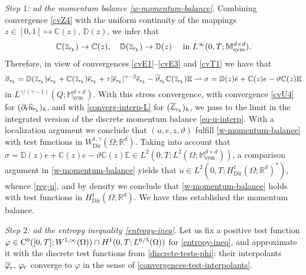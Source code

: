 \documentclass[a4paper,10pt,reqno]{amsart}
\numberwithin{equation}{section}
\newcommand{\bbM}{\mathbb{M}}
\newcommand{\R}{\mathbb{R}}
\numberwithin{equation}{section}
\newcommand{\weakto}{\rightharpoonup} %
\newcommand{\teta}{\vartheta}
\newcommand{\piecewiseConstant}[2]{\overline{#1}_{\kern-1pt#2}}
\newcommand{\pwc}{\piecewiseConstant}
\newcommand{\piecewiseLinear}[2]{{#1}_{\kern-1pt#2}}
\newcommand{\pwl}{\piecewiseLinear}
\newcommand{\pwwll}[2]{\widehat{#1}_{\kern-1pt#2}}
\newcommand{\Dir}{\mathrm{Dir}}
\newcommand{\bbC}{\mathbb{C}}
\newcommand{\bbD}{\mathbb{D}}
\newcommand{\bbE}{\mathbb{E}}
\newcommand{\mt}{\bbM}
\newcommand{\sym}{\mathrm{sym}}
\newcommand{\EEE}{\color{black}}
\newcommand{\MMM}{\color{black}}%
\begin{document}
 \par\noindent
\emph{Step $1$: ad the momentum balance \eqref{w-momentum-balance}.} 
Combining convergence \eqref{cvZ4} with the uniform continuity of the mappings
 $z\in [0,1]\mapsto \bbC(z),\, \bbD(z)$, 
we infer that 
\begin{equation}
\label{cv_CC_DD}
\bbC(\pwc z{\tau_k}) \to \bbC(z), \quad
\bbD(\pwc z{\tau_k}) \to \bbD(z)  \quad \text{ in $L^\infty(0,T; \mt_\sym^{d\times d})$.}
\end{equation}
 Therefore, in view of 
convergences \eqref{cvE1}--\eqref{cvE3} and \eqref{cvT1} we have that 
\begin{equation}
\label{cvS}
\pwc \sigma{\tau_k} = \bbD(\pwc z{\tau_k})  \pwl{\dot e}{\tau_k} + \bbC(\pwc z{\tau_k})  \pwc e{\tau_k} 
+ \tau |\pwc e{\tau_k}|^{\gamma-2} \pwc e{\tau_k}  - \pwc{\teta}{\tau_k} \bbC(\pwc z{\tau_k}) \bbE  \weakto \sigma = \bbD(z) \dot e +\bbC(z) e - \teta  \bbC(z)\bbE  %
\end{equation}
 in 
$L^{\gamma/(\gamma-1)} (Q;\mt_\sym^{d\times d})$.
 With this stress convergence, with convergence \eqref{cvU4} 
 for $(\partial_t \pwwll u{\tau_k})_k$, 
 and with \eqref{converg-interp-L} for $(\pwc \calL{\tau_k})_k$, we pass to the limit in the  \MMM integrated version of the discrete momentum balance \eqref{eq-u-interp}. With a localization argument we 
  \EEE conclude
  that $(u,e, z,\teta)$ fulfill \eqref{w-momentum-balance} with test functions in $W_\Dir^{1,\gamma}(\Omega;\R^d)$. \MMM Taking into account that $\sigma =  \bbD(z) \dot e +\bbC(z) e - \teta  \bbC(z)\bbE \in L^2(0,T;L^2(\Omega;\mt_\sym^{d\times d}))$,  \EEE
 a  comparison argument in  \eqref{w-momentum-balance}  yields  that $\ddot{u} \in L^2(0,T; H_{\Dir}^1(\Omega;\R^d)^*)$, whence \eqref{reg-u},
 and by density we conclude that %
 \eqref{w-momentum-balance} holds with test functions in $H_{\Dir}^1(\Omega;\R^d)$. We have thus established   the momentum
 balance. %
 \par
 \noindent 
 \emph{Step $2$: ad the entropy inequality \eqref{entropy-ineq}.} %
  Let us fix a positive test  function 
  $\varphi \in {\mathrm C}^0 ([0,T]; W^{1,\infty}(\Omega)) \cap H^1(0,T; L^{6/5}(\Omega))$ 
  for \eqref{entropy-ineq}, and approximate it with the discrete
   test functions from \eqref{discrete-tests-phi}: 
   their interpolants $\pwc \varphi\tau, \, \pwl \varphi\tau$ 
   converge to $\varphi$ in the sense of 
    \eqref{convergences-test-interpolants}.
\end{document}
